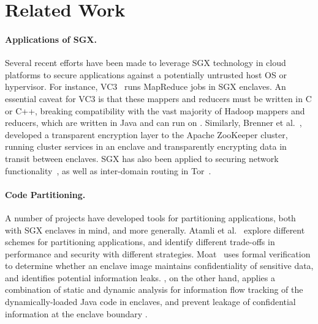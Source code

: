 \section{Related Work}
\label{sec:related}

\paragraph{Applications of SGX.}
Several recent efforts have been made to leverage SGX technology
in cloud platforms to secure applications against a potentially untrusted host OS or hypervisor.
For instance, VC3~\citep{vc3} runs MapReduce jobs in SGX enclaves.
An essential caveat for VC3 is that these mappers and reducers must be written
in C or C++, breaking compatibility with the vast majority of Hadoop mappers and reducers,
which are written in Java and can run on \systemname{}.
Similarly, Brenner et al.~\citep{zookeeper}, developed a transparent encryption 
layer to the Apache ZooKeeper cluster,
running cluster services in an enclave and transparently encrypting data in transit between enclaves.
SGX has also been applied to securing network functionality~\citep{shih2016s},
as well as inter-domain routing in Tor~\citep{kim2015first}.

\paragraph{Code Partitioning.}
A number of projects have developed tools for partitioning applications, both with SGX enclaves in mind, and more generally.
Atamli et al.~\citep{atamli2015securing} explore different schemes for partitioning applications,
and identify different trade-offs in performance and security with different strategies.
Moat~\citep{moat} uses formal verification to determine whether an enclave
image maintains confidentiality of sensitive data,
and identifies potential information leaks.  \systemname{}, on the other hand, applies
a combination of static and dynamic analysis for information flow tracking of the dynamically-loaded Java code in enclaves, and prevent leakage of confidential information at the enclave boundary .%

